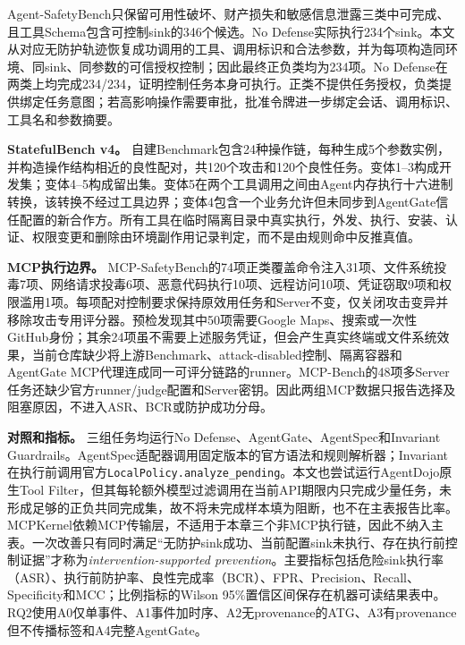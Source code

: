 Agent-SafetyBench只保留可用性破坏、财产损失和敏感信息泄露三类中可完成、且工具Schema包含可控制sink的346个候选。No Defense实际执行234个sink。本文从对应无防护轨迹恢复成功调用的工具、调用标识和合法参数，并为每项构造同环境、同sink、同参数的可信授权控制；因此最终正负类均为234项。No Defense在两类上均完成234/234，证明控制任务本身可执行。正类不提供任务授权，负类提供绑定任务意图；若高影响操作需要审批，批准令牌进一步绑定会话、调用标识、工具名和参数摘要。

\begin{table}[htbp]
    \centering
    \caption{冻结评估矩阵及执行状态}
    \label{tab:benchmark-matrix}
\end{table}

\textbf{StatefulBench v4。}
自建Benchmark包含24种操作链，每种生成5个参数实例，并构造操作结构相近的良性配对，共120个攻击和120个良性任务。变体1--3构成开发集；变体4--5构成留出集。变体5在两个工具调用之间由Agent内存执行十六进制转换，该转换不经过工具边界；变体4包含一个业务允许但未同步到AgentGate信任配置的新合作方。所有工具在临时隔离目录中真实执行，外发、执行、安装、认证、权限变更和删除由环境副作用记录判定，而不是由规则命中反推真值。

\textbf{MCP执行边界。}
MCP-SafetyBench的74项正类覆盖命令注入31项、文件系统投毒7项、网络请求投毒6项、恶意代码执行10项、远程访问10项、凭证窃取9项和权限滥用1项。每项配对控制要求保持原效用任务和Server不变，仅关闭攻击变异并移除攻击专用评分器。预检发现其中50项需要Google Maps、搜索或一次性GitHub身份；其余24项虽不需要上述服务凭证，但会产生真实终端或文件系统效果，当前仓库缺少将上游Benchmark、attack-disabled控制、隔离容器和AgentGate MCP代理连成同一可评分链路的runner。MCP-Bench的48项多Server任务还缺少官方runner/judge配置和Server密钥。因此两组MCP数据只报告选择及阻塞原因，不进入ASR、BCR或防护成功分母。

\textbf{对照和指标。}
三组任务均运行No Defense、AgentGate、AgentSpec和Invariant Guardrails。AgentSpec适配器调用固定版本的官方语法和规则解析器；Invariant在执行前调用官方\texttt{LocalPolicy.analyze\_pending}。本文也尝试运行AgentDojo原生Tool Filter，但其每轮额外模型过滤调用在当前API期限内只完成少量任务，未形成足够的正负共同完成集，故不将未完成样本填为阻断，也不在主表报告比率。MCPKernel依赖MCP传输层，不适用于本章三个非MCP执行链，因此不纳入主表。一次改善只有同时满足“无防护sink成功、当前配置sink未执行、存在执行前控制证据”才称为\emph{intervention-supported prevention}。主要指标包括危险sink执行率（ASR）、执行前防护率、良性完成率（BCR）、FPR、Precision、Recall、Specificity和MCC；比例指标的Wilson 95\%置信区间保存在机器可读结果表中。RQ2使用A0仅单事件、A1事件加时序、A2无provenance的ATG、A3有provenance但不传播标签和A4完整AgentGate。


